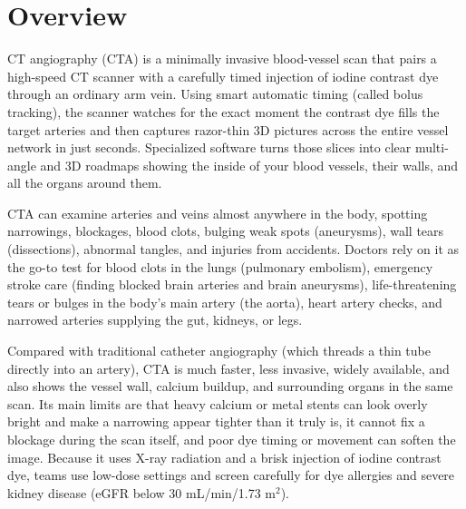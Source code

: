 \label{ch:infographic-cta}

\section{Overview}

CT angiography (CTA) is a minimally invasive blood-vessel scan that pairs a high-speed CT scanner with a carefully timed injection of iodine contrast dye through an ordinary arm vein. Using smart automatic timing (called bolus tracking), the scanner watches for the exact moment the contrast dye fills the target arteries and then captures razor-thin 3D pictures across the entire vessel network in just seconds. Specialized software turns those slices into clear multi-angle and 3D roadmaps showing the inside of your blood vessels, their walls, and all the organs around them.

CTA can examine arteries and veins almost anywhere in the body, spotting narrowings, blockages, blood clots, bulging weak spots (aneurysms), wall tears (dissections), abnormal tangles, and injuries from accidents. Doctors rely on it as the go-to test for blood clots in the lungs (pulmonary embolism), emergency stroke care (finding blocked brain arteries and brain aneurysms), life-threatening tears or bulges in the body's main artery (the aorta), heart artery checks, and narrowed arteries supplying the gut, kidneys, or legs.

Compared with traditional catheter angiography (which threads a thin tube directly into an artery), CTA is much faster, less invasive, widely available, and also shows the vessel wall, calcium buildup, and surrounding organs in the same scan. Its main limits are that heavy calcium or metal stents can look overly bright and make a narrowing appear tighter than it truly is, it cannot fix a blockage during the scan itself, and poor dye timing or movement can soften the image. Because it uses X-ray radiation and a brisk injection of iodine contrast dye, teams use low-dose settings and screen carefully for dye allergies and severe kidney disease (eGFR below 30 mL/min/1.73 m$^2$).

